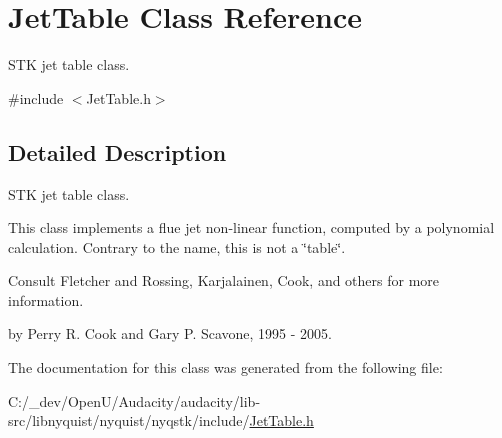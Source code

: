 \hypertarget{class_jet_table}{}\section{Jet\+Table Class Reference}
\label{class_jet_table}


S\+TK jet table class.  




{\ttfamily \#include $<$Jet\+Table.\+h$>$}



\subsection{Detailed Description}
S\+TK jet table class. 

This class implements a flue jet non-\/linear function, computed by a polynomial calculation. Contrary to the name, this is not a \char`\"{}table\char`\"{}.

Consult Fletcher and Rossing, Karjalainen, Cook, and others for more information.

by Perry R. Cook and Gary P. Scavone, 1995 -\/ 2005. 

The documentation for this class was generated from the following file\+:\begin{DoxyCompactItemize}
\item 
C\+:/\+\_\+dev/\+Open\+U/\+Audacity/audacity/lib-\/src/libnyquist/nyquist/nyqstk/include/\hyperlink{_jet_table_8h}{Jet\+Table.\+h}\end{DoxyCompactItemize}
